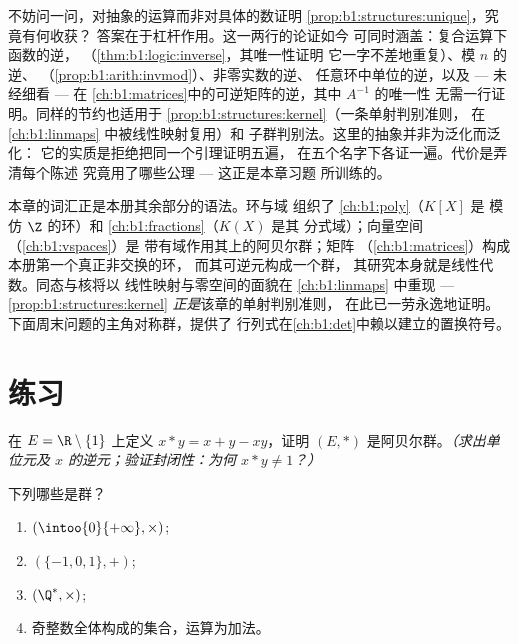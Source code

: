 \begin{remark}[插曲：抽象带来了什么]\label{rem:b1:structures:interlude}
不妨问一问，对抽象的运算而非对具体的数证明
\cref{prop:b1:structures:unique}，究竟有何收获？
答案在于杠杆作用。这一两行的论证如今
可同时涵盖：复合运算下函数的逆，
（\cref{thm:b1:logic:inverse}，其唯一性证明
它一字不差地重复）、模 $n$ 的逆、
（\cref{prop:b1:arith:invmod}）、非零实数的逆、
任意环中单位的逆，以及 --- 未经细看 --- 在
\cref{ch:b1:matrices}中的可逆矩阵的逆，其中 $A^{-1}$ 的唯一性
无需一行证明。同样的节约也适用于
\cref{prop:b1:structures:kernel}（一条单射判别准则，
在 \cref{ch:b1:linmaps} 中被线性映射复用）和
子群判别法。这里的抽象并非为泛化而泛化：
它的实质是拒绝把同一个引理证明五遍，
在五个名字下各证一遍。代价是弄清每个陈述
究竟用了哪些公理 --- 这正是本章习题
所训练的。
\end{remark}

\begin{remark}[本章的应用]\label{rem:b1:structures:whereused}
本章的词汇正是本册其余部分的语法。环与域
组织了 \cref{ch:b1:poly}（$K[X]$ 是
模仿 $\Z$ 的环）和 \cref{ch:b1:fractions}（$K(X)$ 是其
分式域）；向量空间（\cref{ch:b1:vspaces}）是
带有域作用其上的阿贝尔群；矩阵
（\cref{ch:b1:matrices}）构成本册第一个真正非交换的环，
而其可逆元构成一个群，
其研究本身就是线性代数。同态与核将以
线性映射与零空间的面貌在 \cref{ch:b1:linmaps} 中重现 ---
\cref{prop:b1:structures:kernel} \emph{正是}该章的单射判别准则，
在此已一劳永逸地证明。
下面周末问题的主角对称群，提供了
行列式在\cref{ch:b1:det}中赖以建立的置换符号。
\end{remark}

\section{练习}

\begin{exercise}[$\star$]\label{exo:b1:structures:1}
在 $E = \R \setminus \{1\}$ 上定义 $x * y = x + y - xy$，证明
$(E, *)$ 是阿贝尔群。\emph{（求出单位元及
$x$ 的逆元；验证封闭性：为何 $x * y \neq 1$？）}
\end{exercise}

\begin{exercise}[$\star$]\label{exo:b1:structures:2}
下列哪些是群？
\begin{enumerate}
  \item $(\intoo{0}{+\infty}, \times)$;
  \item $(\{-1, 0, 1\}, +)$;
  \item $(\Q^*, \times)$;
  \item 奇整数全体构成的集合，运算为加法。
\end{enumerate}
\end{exercise}

